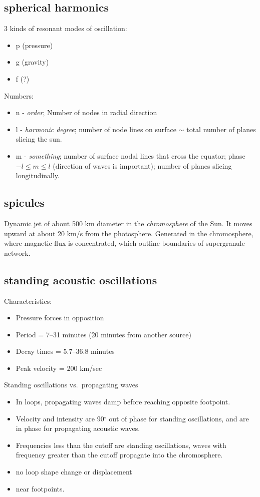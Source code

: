 \documentclass{article}
\begin{document}
\subsection{spherical harmonics}
3 kinds of resonant modes of oscillation:
\begin{itemize}
    \item p (pressure)
    \item g (gravity)
    \item f (?)
\end{itemize}
Numbers:
\begin{itemize}
    \item n - \emph{order}; Number of nodes in radial direction
    \item l - \emph{harmonic degree}; number of node lines on
        surface $\sim$ total number of planes slicing the sun.
    \item m - \emph{something}; number of surface nodal lines that
        cross the equator; phase\\
        $-l \leq m \leq l$ (direction of waves is important); number of
        planes slicing longitudinally.
\end{itemize}

\subsection{spicules}
Dynamic jet of about 500 km diameter in the \emph{chromosphere} of the Sun.
It moves upward at about 20 km/s from the photosphere. Generated in the
chromosphere, where magnetic flux is concentrated, which outline boundaries
of supergranule network.

\subsection{standing acoustic oscillations}
Characteristics:
\begin{itemize}
    \item Pressure forces in opposition
    \item Period = 7--31 minutes (20 minutes from another source)
    \item Decay times = 5.7--36.8 minutes
    \item Peak velocity = 200 km/sec
\end{itemize}
Standing oscillations vs.\ propagating waves
\begin{itemize}
    \item In loops, propagating waves damp before
        reaching opposite footpoint.
    \item Velocity and intensity are 90$^{\circ}$ out of phase
        for standing oscillations, and are in phase for propagating
        acoustic waves.
    \item Frequencies less than the cutoff are standing oscillations,
        waves with frequency greater than the cutoff propagate into
        the chromosphere.
    \item no loop shape change or displacement
    \item near footpoints.
\end{itemize}
\end{document}
